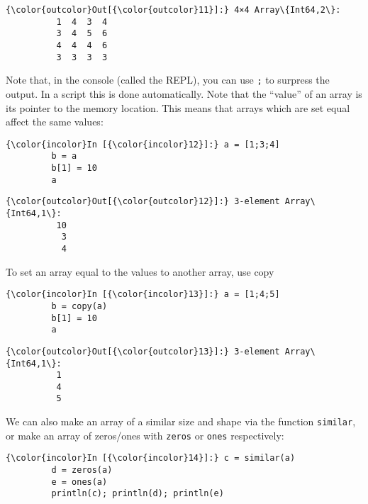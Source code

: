 \documentclass[11pt]{article}
\begin{document}
            \begin{Verbatim}[commandchars=\\\{\}]
{\color{outcolor}Out[{\color{outcolor}11}]:} 4×4 Array\{Int64,2\}:
          1  4  3  4
          3  4  5  6
          4  4  4  6
          3  3  3  3
\end{Verbatim}
        
    Note that, in the console (called the REPL), you can use \texttt{;} to
surpress the output. In a script this is done automatically. Note that
the ``value'' of an array is its pointer to the memory location. This
means that arrays which are set equal affect the same values:

    \begin{Verbatim}[commandchars=\\\{\}]
{\color{incolor}In [{\color{incolor}12}]:} a = [1;3;4]
         b = a
         b[1] = 10
         a
\end{Verbatim}

            \begin{Verbatim}[commandchars=\\\{\}]
{\color{outcolor}Out[{\color{outcolor}12}]:} 3-element Array\{Int64,1\}:
          10
           3
           4
\end{Verbatim}
        
    To set an array equal to the values to another array, use copy

    \begin{Verbatim}[commandchars=\\\{\}]
{\color{incolor}In [{\color{incolor}13}]:} a = [1;4;5]
         b = copy(a)
         b[1] = 10
         a
\end{Verbatim}

            \begin{Verbatim}[commandchars=\\\{\}]
{\color{outcolor}Out[{\color{outcolor}13}]:} 3-element Array\{Int64,1\}:
          1
          4
          5
\end{Verbatim}
        
    We can also make an array of a similar size and shape via the function
\texttt{similar}, or make an array of zeros/ones with \texttt{zeros} or
\texttt{ones} respectively:

    \begin{Verbatim}[commandchars=\\\{\}]
{\color{incolor}In [{\color{incolor}14}]:} c = similar(a)
         d = zeros(a)
         e = ones(a)
         println(c); println(d); println(e)
\end{Verbatim}
\end{document}
